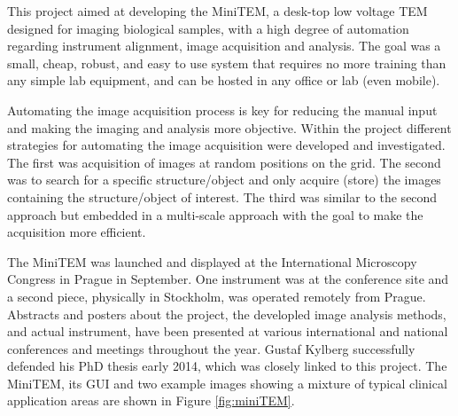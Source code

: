 \begin{enumerate}
{This project aimed at developing the MiniTEM, a desk-top low voltage TEM designed for imaging biological samples, with a high degree of automation regarding instrument alignment, image acquisition and analysis. The goal was a small, cheap, robust, and easy to use system that requires no more training than any simple lab equipment, and can be hosted in any office or lab (even mobile).
	
Automating the image acquisition process is key for reducing the manual input and making the imaging and analysis more objective. Within the project different strategies for automating the image acquisition were developed and investigated. The first was acquisition of images at random positions on the grid. The second was to search for a specific structure/object and only acquire (store) the images containing the structure/object of interest. The third was similar to the second approach but embedded in a multi-scale approach with the goal to make the acquisition more efficient.
	
The MiniTEM was launched and displayed at the International Microscopy Congress in Prague in September. One instrument was at the conference site and a second piece, physically in Stockholm, was operated remotely from Prague. Abstracts and posters about the project, the developled image analysis methods, and actual instrument, have been presented at various international and national conferences and meetings throughout the year. Gustaf Kylberg successfully defended his PhD thesis early 2014, which was closely linked to this project. The MiniTEM, its GUI and two example images showing a mixture of typical clinical application areas are shown in Figure \ref{fig:miniTEM}.}

\begin{figure}[!h]
	\centering
	

\end{figure}
\end{enumerate}
